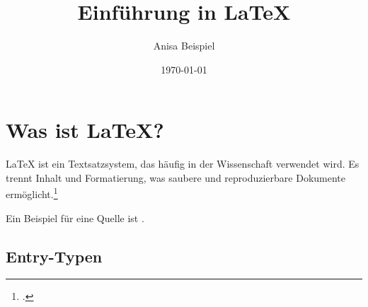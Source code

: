 \documentclass[a4paper,12pt]{article}
\title{Einführung in \LaTeX}
\author{Anisa Beispiel}
\date{\today}
\begin{document}
\maketitle

\tableofcontents
\newpage

\section{Was ist \LaTeX?}
\LaTeX{} ist ein Textsatzsystem, das häufig in der Wissenschaft verwendet wird.
Es trennt Inhalt und Formatierung, was saubere und reproduzierbare Dokumente ermöglicht.\footcite{maier2004}

Ein Beispiel für eine Quelle ist \cite{DemoQuelle}.
\subsection{Entry-Typen}
\end{document}
